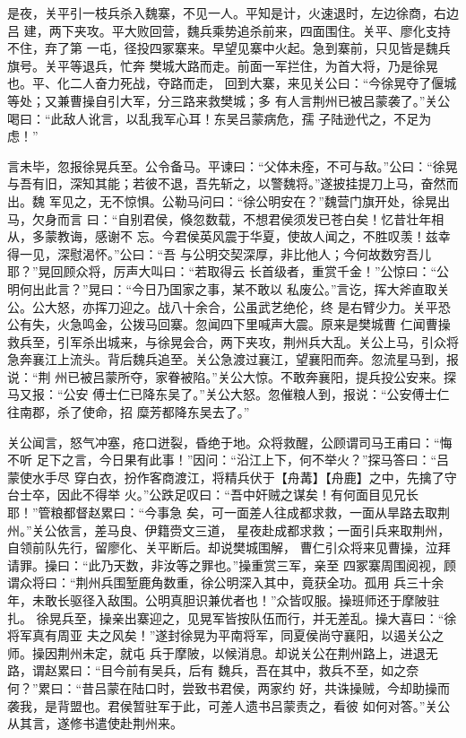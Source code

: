是夜，关平引一枝兵杀入魏寨，不见一人。平知是计，火速退时，左边徐商，右边吕
建，两下夹攻。平大败回营，魏兵乘势追杀前来，四面围住。关平、廖化支持不住，弃了第
一屯，径投四冢寨来。早望见寨中火起。急到寨前，只见皆是魏兵旗号。关平等退兵，忙奔
樊城大路而走。前面一军拦住，为首大将，乃是徐晃也。平、化二人奋力死战，夺路而走，
回到大寨，来见关公曰：“今徐晃夺了偃城等处；又兼曹操自引大军，分三路来救樊城；多
有人言荆州已被吕蒙袭了。”关公喝曰：“此敌人讹言，以乱我军心耳！东吴吕蒙病危，孺
子陆逊代之，不足为虑！”

言未毕，忽报徐晃兵至。公令备马。平谏曰：“父体未痊，不可与敌。”公曰：“徐晃
与吾有旧，深知其能；若彼不退，吾先斩之，以警魏将。”遂披挂提刀上马，奋然而出。魏
军见之，无不惊惧。公勒马问曰：“徐公明安在？”魏营门旗开处，徐晃出马，欠身而言
曰：“自别君侯，倏忽数载，不想君侯须发已苍白矣！忆昔壮年相从，多蒙教诲，感谢不
忘。今君侯英风震于华夏，使故人闻之，不胜叹羡！兹幸得一见，深慰渴怀。”公曰：“吾
与公明交契深厚，非比他人；今何故数穷吾儿耶？”晃回顾众将，厉声大叫曰：“若取得云
长首级者，重赏千金！”公惊曰：“公明何出此言？”晃曰：“今日乃国家之事，某不敢以
私废公。”言讫，挥大斧直取关公。公大怒，亦挥刀迎之。战八十余合，公虽武艺绝伦，终
是右臂少力。关平恐公有失，火急鸣金，公拨马回寨。忽闻四下里喊声大震。原来是樊城曹
仁闻曹操救兵至，引军杀出城来，与徐晃会合，两下夹攻，荆州兵大乱。关公上马，引众将
急奔襄江上流头。背后魏兵追至。关公急渡过襄江，望襄阳而奔。忽流星马到，报说：“荆
州已被吕蒙所夺，家眷被陷。”关公大惊。不敢奔襄阳，提兵投公安来。探马又报：“公安
傅士仁已降东吴了。”关公大怒。忽催粮人到，报说：“公安傅士仁往南郡，杀了使命，招
糜芳都降东吴去了。”

关公闻言，怒气冲塞，疮口迸裂，昏绝于地。众将救醒，公顾谓司马王甫曰：“悔不听
足下之言，今日果有此事！”因问：“沿江上下，何不举火？”探马答曰：“吕蒙使水手尽
穿白衣，扮作客商渡江，将精兵伏于【舟冓】【舟鹿】之中，先擒了守台士卒，因此不得举
火。”公跌足叹曰：“吾中奸贼之谋矣！有何面目见兄长耶！”管粮都督赵累曰：“今事急
矣，可一面差人往成都求救，一面从旱路去取荆州。”关公依言，差马良、伊籍赍文三道，
星夜赴成都求救；一面引兵来取荆州，自领前队先行，留廖化、关平断后。却说樊城围解，
曹仁引众将来见曹操，泣拜请罪。操曰：“此乃天数，非汝等之罪也。”操重赏三军，亲至
四冢寨周围阅视，顾谓众将曰：“荆州兵围堑鹿角数重，徐公明深入其中，竟获全功。孤用
兵三十余年，未敢长驱径入敌围。公明真胆识兼优者也！”众皆叹服。操班师还于摩陂驻扎。
徐晃兵至，操亲出寨迎之，见晃军皆按队伍而行，并无差乱。操大喜曰：“徐将军真有周亚
夫之风矣！”遂封徐晃为平南将军，同夏侯尚守襄阳，以遏关公之师。操因荆州未定，就屯
兵于摩陂，以候消息。却说关公在荆州路上，进退无路，谓赵累曰：“目今前有吴兵，后有
魏兵，吾在其中，救兵不至，如之奈何？”累曰：“昔吕蒙在陆口时，尝致书君侯，两家约
好，共诛操贼，今却助操而袭我，是背盟也。君侯暂驻军于此，可差人遗书吕蒙责之，看彼
如何对答。”关公从其言，遂修书遣使赴荆州来。

